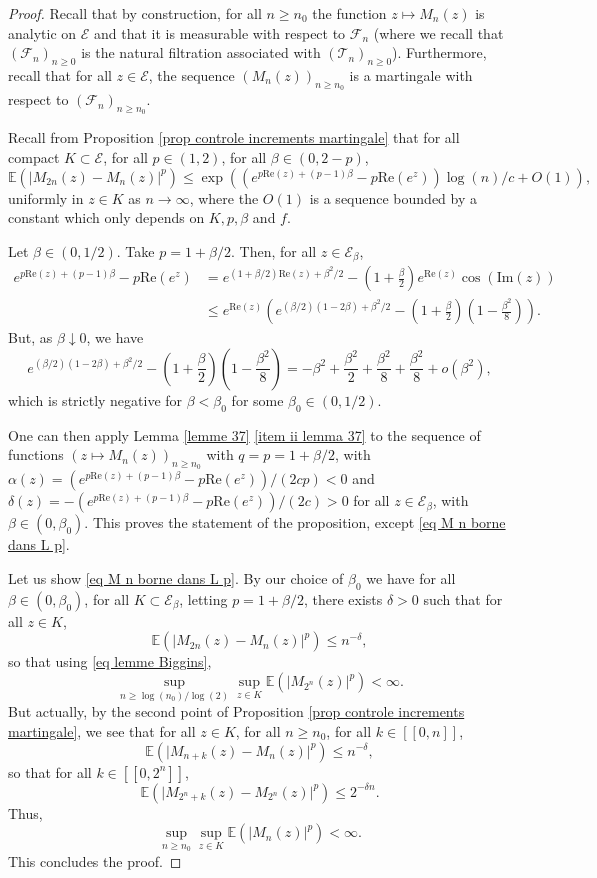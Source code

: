 \documentclass[11pt]{article}
\numberwithin{equation}{section}
\def \T{\mathcal{T}}
\def\E{\mathbb{E}}
\def\lb{[\![}
\def\rb{]\!]}
\renewcommand{\Re}{\mathrm{Re}}
\begin{document}
\begin{proof}
	Recall that by construction, for all $n\ge n_0$ the function $z\mapsto M_n(z)$ is analytic on $\mathcal{E}$ and that it is measurable with respect to $\mathcal{F}_n$ (where we recall that $(\mathcal{F}_n)_{n\ge 0}$ is the natural filtration associated with $(\T_n)_{n\ge 0}$). Furthermore, recall that for all $z \in \mathcal{E}$, the sequence $(M_n(z))_{n\ge n_0}$ is a martingale with respect to $(\mathcal{F}_n)_{n\ge n_0}$.
	
	Recall from Proposition \ref{prop controle increments martingale} that for all compact $K\subset \mathcal{E}$, for all $p \in (1,2)$, for all $\beta \in (0,2-p)$,
	\[
	\E\left( \left\vert M_{2n}(z)- M_n(z)\right\vert^p\right)\le 
	\exp\left( \left(e^{p \Re(z) +(p-1)\beta}-p\Re(e^z)\right) \log (n)/c + O(1)\right),
	\]
	uniformly in $z \in K$ as $n\to \infty$, where the $O(1)$ is a sequence bounded by a constant which only depends on $K, p, \beta$ and $f$.

	Let $\beta \in (0,1/2)$. Take $p=1+\beta/2$. Then, for all $z \in \mathcal{E}_\beta$, 
	\begin{align*}
		e^{p\Re(z)+(p-1)\beta} - p \Re(e^z) &=
		e^{(1+\beta/2) \Re(z) + \beta^2/2}- \left(1+\frac{\beta}{2}\right) e^{\Re(z)} \cos(\mathrm{Im}(z))\\
		&\le e^{\Re(z)}\left( e^{(\beta/2)(1-2\beta) + \beta^2/2} - \left(1 + \frac{\beta}{2}\right)\left(1-\frac{\beta^2}{8}\right) \right).
	\end{align*}
	But, as $\beta \downarrow 0$, we have
	\[
	e^{(\beta/2)(1-2\beta) + \beta^2/2} - \left(1 + \frac{\beta}{2}\right)\left(1-\frac{\beta^2}{8}\right) = -\beta^2 +\frac{\beta^2}{2} + \frac{\beta^2}{8} + \frac{\beta^2}{8} + o(\beta^2),
	\]
	which is strictly negative for $\beta<\beta_0$ for some $\beta_0\in (0,1/2)$.
	
	One can then apply Lemma \ref{lemme 37} \eqref{item ii lemma 37} to the sequence of functions $(z\mapsto M_n(z))_{n\ge n_0}$ with $q=p=1+\beta/2$, with $\alpha(z)=(e^{p\Re(z) +(p-1)\beta}-p\Re(e^{z}))/(2cp)<0$ and $\delta(z)=-(e^{p\Re(z) +(p-1)\beta}-p\Re(e^{z}))/(2c) >0$ for all $z \in \mathcal{E}_\beta$, with $\beta \in (0, \beta_0)$. This proves the statement of the proposition, except \eqref{eq M n borne dans L p}.
	
	Let us show \eqref{eq M n borne dans L p}. By our choice of $\beta_0 $ we have for all $\beta \in (0, \beta_0)$, for all $K\subset \mathcal{E}_\beta$, letting $p=1+\beta /2$, there exists $\delta>0$ such that for all $z \in K$, 
	\[
	\E\left( \vert M_{2n}(z)- M_n(z) \vert^p\right)\le n^{-\delta },
	\]
	so that using \eqref{eq lemme Biggins},
	\[
	\sup_{n\ge \log(n_0)/\log(2)} \sup_{z \in K} \E\left( \vert M_{2^n}(z) \vert^p\right)<\infty.
	\]
	But actually, by the second point of Proposition \ref{prop controle increments martingale}, we see that for all $z \in K$, for all $n\ge n_0$, for all $k \in \lb 0 , n \rb$,
	\[
	\E\left( \vert M_{n+k}(z)- M_n(z) \vert^p\right)\le n^{-\delta },
	\]
	so that for all $k \in \lb 0, 2^n\rb$,
	\[
	\E\left( \vert M_{2^n+k}(z)- M_{2^n}(z) \vert^p\right)\le 2^{-\delta n}.
	\]
	Thus,
	\[
	\sup_{n\ge n_0}\sup_{z \in K} \E\left(\vert M_n(z)\vert^p \right)<\infty.
	\]
	This concludes the proof.
\end{proof}
\end{document}
